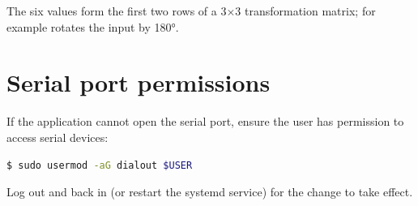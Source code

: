 The six values form the first two rows of a 3$\times$3 transformation matrix;
for example  rotates the input by 180°.

\section{Serial port permissions}

If the application cannot open the serial port, ensure the user has permission to
access serial devices:

\begin{lstlisting}[language=bash]
$ sudo usermod -aG dialout $USER
\end{lstlisting}

Log out and back in (or restart the systemd service) for the change to take effect.
